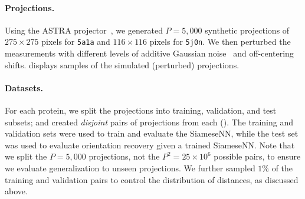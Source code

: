 \paragraph{Projections.}
Using the ASTRA projector~\cite{van2015astra}, we generated $P=5,000$ synthetic projections of $275 \times 275$ pixels for \texttt{5a1a} and $116 \times 116$ pixels for \texttt{5j0n}.
We then perturbed the measurements with different levels of additive Gaussian noise~\cite{sorzano2004normalizing,shigematsu2013noise} and off-centering shifts. %
 displays samples of the simulated (perturbed) projections.

\paragraph{Datasets.}
For each protein, we split the projections into training, validation, and test subsets; and created \textit{disjoint} pairs of projections from each ().
The training and validation sets were used to train and evaluate the SiameseNN, while the test set was used to evaluate orientation recovery given a trained SiameseNN.
Note that we split the $P=5,000$ projections, not the $P^2 = 25 \times 10^6$ possible pairs, to ensure we evaluate generalization to unseen projections.
We further sampled $1\%$ of the training and validation pairs to control the distribution of distances, as discussed above.

